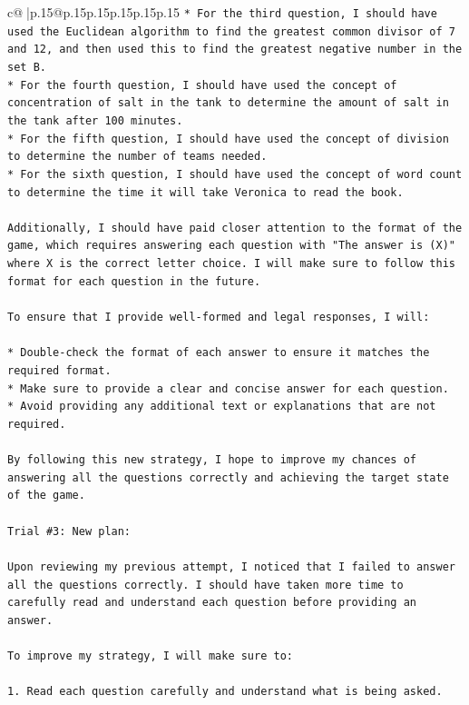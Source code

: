 \documentclass{article}
\begin{document}
{\begin{supertabular}{c@{$\;$}|p{.15\linewidth}@{}p{.15\linewidth}p{.15\linewidth}p{.15\linewidth}p{.15\linewidth}p{.15\linewidth}}
{{{\texttt{* For the third question, I should have used the Euclidean algorithm to find the greatest common divisor of 7 and 12, and then used this to find the greatest negative number in the set B.} \\
\texttt{* For the fourth question, I should have used the concept of concentration of salt in the tank to determine the amount of salt in the tank after 100 minutes.} \\
\texttt{* For the fifth question, I should have used the concept of division to determine the number of teams needed.} \\
\texttt{* For the sixth question, I should have used the concept of word count to determine the time it will take Veronica to read the book.} \\
\\ 
\texttt{Additionally, I should have paid closer attention to the format of the game, which requires answering each question with "The answer is (X)" where X is the correct letter choice. I will make sure to follow this format for each question in the future.} \\
\\ 
\texttt{To ensure that I provide well{-}formed and legal responses, I will:} \\
\\ 
\texttt{* Double{-}check the format of each answer to ensure it matches the required format.} \\
\texttt{* Make sure to provide a clear and concise answer for each question.} \\
\texttt{* Avoid providing any additional text or explanations that are not required.} \\
\\ 
\texttt{By following this new strategy, I hope to improve my chances of answering all the questions correctly and achieving the target state of the game.} \\
\\ 
\texttt{Trial \#3: New plan: } \\
\\ 
\texttt{Upon reviewing my previous attempt, I noticed that I failed to answer all the questions correctly. I should have taken more time to carefully read and understand each question before providing an answer. } \\
\\ 
\texttt{To improve my strategy, I will make sure to:} \\
\\ 
\texttt{1. Read each question carefully and understand what is being asked.} \\
}}}
\end{supertabular}}
\end{document}
